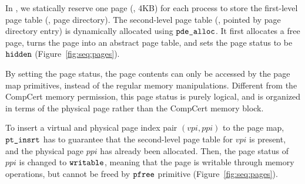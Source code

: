 In \mCTOS{},
we statically reserve one page (\ie, 4KB)
for each process to store  the first-level page table
(\ie, page directory).
The second-level page table (\ie, pointed by page directory entry)
is dynamically allocated
using $\code{pde\_alloc}$.
It first allocates a free page,
turns the page into an abstract page table,
and sets the page status to be $\code{hidden}$ (\cf Figure~\ref{fig:seq:pages}).
By setting the page status, the page contents can only be accessed
by the page map primitives,
instead of the regular memory manipulations.
Different from the CompCert memory 
permission,
this page status is purely logical,
and is organized in terms of the physical page
rather than the CompCert memory block.

To insert
a virtual and physical page index pair
$(\mathit{vpi}, \mathit{ppi})$ to the page map,
$\code{pt\_insrt}$ has to guarantee that
the second-level page table for $\mathit{vpi}$ 
is present,
and the physical page $\mathit{ppi}$ has already been
allocated.
Then, the page status of $\mathit{ppi}$ is changed
to $\code{writable}$,
meaning that the page is writable through
memory operations,
but cannot be freed by $\code{pfree}$
primitive (\cf Figure~\ref{fig:seq:pages}).
 \begin{mathpar}
\end{mathpar}

